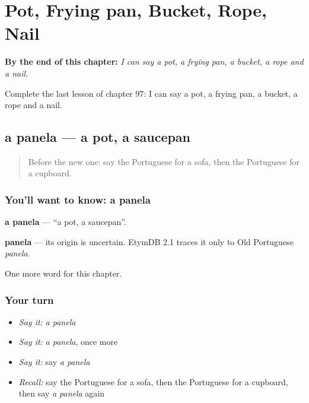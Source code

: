 
\chapter{Pot, Frying pan, Bucket, Rope, Nail}
\label{ch:pt-pot-frying-pan-bucket-rope-nail}

\begin{chapteropening}
\textbf{By the end of this chapter:} \emph{I can say a pot, a frying pan, a bucket, a rope and a nail.}

Complete the last lesson of chapter 97: I can say a pot, a frying pan, a bucket, a rope and a nail.
\end{chapteropening}

\section[a panela]{a panela — a pot, a saucepan}

\label{lesson:PT-C97-panela}



\begin{quote}
Before the new one: say the Portuguese for a sofa, then the Portuguese for a cupboard.
\end{quote}

\subsection*{You'll want to know: a panela}
\textbf{a panela} — \textquotedblleft{}a pot, a saucepan\textquotedblright{}.

\begin{cousinweb}
\textbf{panela} — its origin is uncertain. EtymDB 2.1 traces it only to Old Portuguese \emph{panela}.
\end{cousinweb}

\begin{grammarlens}[title={What you've built}]
One more word for this chapter.
\end{grammarlens}

\subsection*{Your turn}
\begin{itemize}
\raggedright
  \item \emph{Say it:} \emph{a panela}
  \item \emph{Say it:} \emph{a panela}, once more
  \item \emph{Say it:} say \emph{a panela}
  \item \emph{Recall:} say the Portuguese for a sofa, then the Portuguese for a cupboard, then say \emph{a panela} again
\end{itemize}

